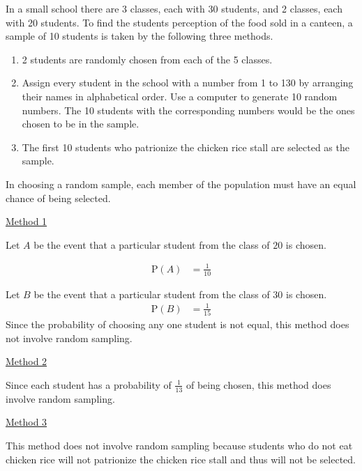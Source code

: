 \documentclass[11pt,a4paper]{book}
\begin{document}
\begin{example}

In a small school there are 3 classes, each with 30 students, and
2 classes, each with 20 students. To find the students perception
of the food sold in a canteen, a sample of 10 students is taken by
the following three methods. 

\begin{enumerate}[label=Method \arabic*:, leftmargin=2cm]

\item  2 students are randomly chosen from each of the 5 classes.

\item  Assign every student in the school with a number from 1 to
130 by arranging their names in alphabetical order. Use a computer
to generate 10 random numbers. The 10 students with the corresponding
numbers would be the ones chosen to be in the sample.

\item  The first 10 students who patrionize the chicken rice stall
are selected as the sample.

\end{enumerate}

\Solution

In choosing a random sample, each member of the population must have an equal chance of being selected.

\uline{Method 1}

Let $A$ be the event that a particular student from the class of
$20$ is chosen.

\begin{align*}
\text{P}\left(A\right) & =\frac{1}{10}
\end{align*}

Let $B$ be the event that a particular student from the class of
$30$ is chosen.
\begin{align*}
\text{P}\left(B\right) & =\frac{1}{15}
\end{align*}
Since the probability of choosing any one student is not equal, this
method does not involve random sampling.

\uline{Method 2}

Since each student has a probability of ${\displaystyle \frac{1}{13}}$
of being chosen, this method does involve random sampling.

\uline{Method 3}

This method does not involve random sampling because students who
do not eat chicken rice will not patrionize the chicken rice stall
and thus will not be selected.

\end{example}
\end{document}
